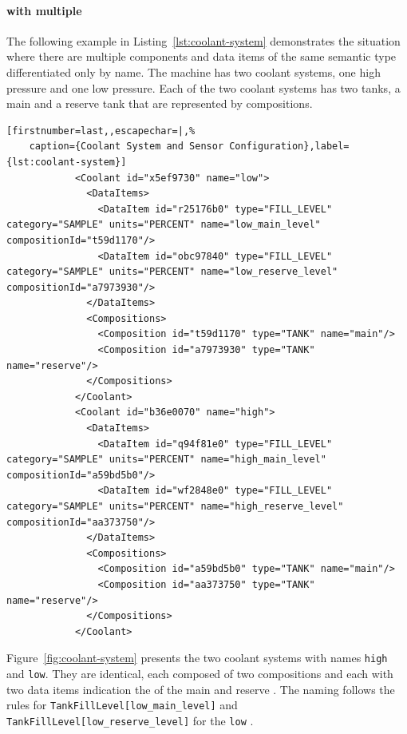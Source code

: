 \FloatBarrier

\paragraph{  with multiple }

The following example in Listing~\ref{lst:coolant-system} demonstrates the situation where there are multiple components and data items of the same semantic type differentiated only by name. The machine has two coolant systems, one high pressure and one low pressure. Each of the two coolant systems has two tanks, a main and a reserve tank that are represented by compositions. 

\begin{lstlisting}[firstnumber=last,,escapechar=|,%
    caption={Coolant System and Sensor Configuration},label={lst:coolant-system}]
            <Coolant id="x5ef9730" name="low">
              <DataItems>
                <DataItem id="r25176b0" type="FILL_LEVEL" category="SAMPLE" units="PERCENT" name="low_main_level" compositionId="t59d1170"/>
                <DataItem id="obc97840" type="FILL_LEVEL" category="SAMPLE" units="PERCENT" name="low_reserve_level" compositionId="a7973930"/>
              </DataItems>
              <Compositions>
                <Composition id="t59d1170" type="TANK" name="main"/>
                <Composition id="a7973930" type="TANK" name="reserve"/>
              </Compositions>
            </Coolant>
            <Coolant id="b36e0070" name="high">
              <DataItems>
                <DataItem id="q94f81e0" type="FILL_LEVEL" category="SAMPLE" units="PERCENT" name="high_main_level" compositionId="a59bd5b0"/>
                <DataItem id="wf2848e0" type="FILL_LEVEL" category="SAMPLE" units="PERCENT" name="high_reserve_level" compositionId="aa373750"/>
              </DataItems>
              <Compositions>
                <Composition id="a59bd5b0" type="TANK" name="main"/>
                <Composition id="aa373750" type="TANK" name="reserve"/>
              </Compositions>
            </Coolant>
 \end{lstlisting}

Figure~\ref{fig:coolant-system} presents the two coolant systems with names \texttt{high} and \texttt{low}. They are identical, each composed of two  compositions and each with two data items indication the  of the main and reserve . The naming follows the rules for \texttt{TankFillLevel[low_main_level]} and \texttt{TankFillLevel[low_reserve_level]} for the \texttt{low} . 

